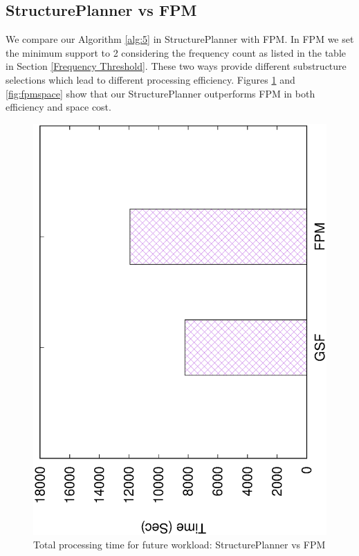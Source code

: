 \subsection{StructurePlanner vs FPM}
\label{StructurePlanner vs FPM}
We compare our Algorithm \ref{alg:5} in StructurePlanner with FPM. In FPM we set the minimum support to 2 considering the frequency count as listed in the table in Section \ref{Frequency Threshold}. These two ways provide different substructure selections which lead to different processing efficiency. Figures \ref{fig:fpmtotal} and \ref{fig:fpmspace} show that our StructurePlanner outperforms FPM in both efficiency and space cost.

\begin{figure}[H]
	\centering
	\includegraphics[scale=0.43, angle=270]{plot/fpm.eps}
	\caption{Total processing time for future workload: StructurePlanner vs FPM}
	\label{fig:fpmtotal}
\end{figure}

